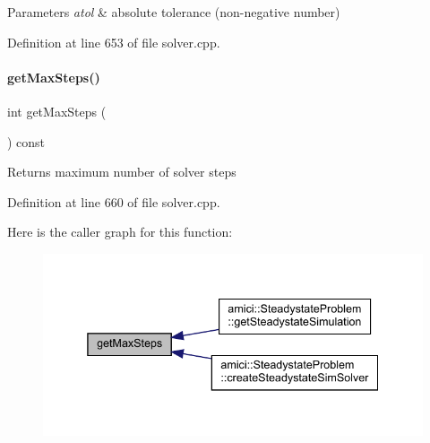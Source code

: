 \begin{DoxyParams}{Parameters}
{\em atol} & absolute tolerance (non-\/negative number) \\
\hline
\end{DoxyParams}


Definition at line 653 of file solver.\+cpp.

\mbox{\label{classamici_1_1_solver_acf39690ae4c940c7734fc3fadabb4d50}} 
\paragraph{\texorpdfstring{get\+Max\+Steps()}{getMaxSteps()}}
{\footnotesize\ttfamily int get\+Max\+Steps (\begin{DoxyParamCaption}{ }\end{DoxyParamCaption}) const}

\begin{DoxyReturn}{Returns}
maximum number of solver steps 
\end{DoxyReturn}


Definition at line 660 of file solver.\+cpp.

Here is the caller graph for this function\+:
\nopagebreak
\begin{figure}[H]
\begin{center}
\leavevmode
\includegraphics[width=338pt]{classamici_1_1_solver_acf39690ae4c940c7734fc3fadabb4d50_icgraph}
\end{center}
\end{figure}
\mbox{\label{classamici_1_1_solver_ab321627a9f9d22013638e0eb9b14d2dc}} 
